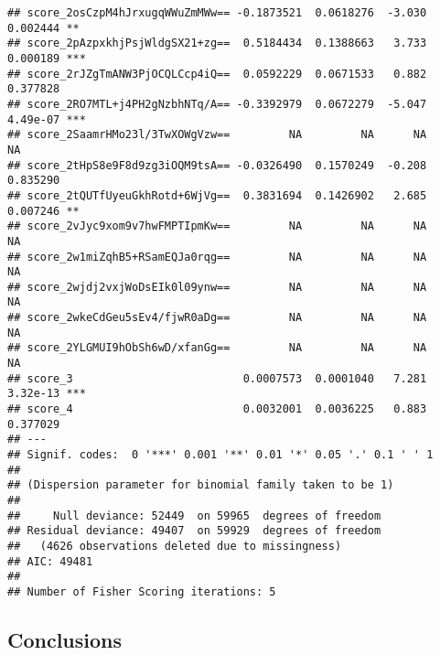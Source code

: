 \documentclass[]{article}
\begin{document}
\begin{verbatim}
## score_2osCzpM4hJrxugqWWuZmMWw== -0.1873521  0.0618276  -3.030 0.002444 ** 
## score_2pAzpxkhjPsjWldgSX21+zg==  0.5184434  0.1388663   3.733 0.000189 ***
## score_2rJZgTmANW3PjOCQLCcp4iQ==  0.0592229  0.0671533   0.882 0.377828    
## score_2RO7MTL+j4PH2gNzbhNTq/A== -0.3392979  0.0672279  -5.047 4.49e-07 ***
## score_2SaamrHMo23l/3TwXOWgVzw==         NA         NA      NA       NA    
## score_2tHpS8e9F8d9zg3iOQM9tsA== -0.0326490  0.1570249  -0.208 0.835290    
## score_2tQUTfUyeuGkhRotd+6WjVg==  0.3831694  0.1426902   2.685 0.007246 ** 
## score_2vJyc9xom9v7hwFMPTIpmKw==         NA         NA      NA       NA    
## score_2w1miZqhB5+RSamEQJa0rqg==         NA         NA      NA       NA    
## score_2wjdj2vxjWoDsEIk0l09ynw==         NA         NA      NA       NA    
## score_2wkeCdGeu5sEv4/fjwR0aDg==         NA         NA      NA       NA    
## score_2YLGMUI9hObSh6wD/xfanGg==         NA         NA      NA       NA    
## score_3                          0.0007573  0.0001040   7.281 3.32e-13 ***
## score_4                          0.0032001  0.0036225   0.883 0.377029    
## ---
## Signif. codes:  0 '***' 0.001 '**' 0.01 '*' 0.05 '.' 0.1 ' ' 1
## 
## (Dispersion parameter for binomial family taken to be 1)
## 
##     Null deviance: 52449  on 59965  degrees of freedom
## Residual deviance: 49407  on 59929  degrees of freedom
##   (4626 observations deleted due to missingness)
## AIC: 49481
## 
## Number of Fisher Scoring iterations: 5
\end{verbatim}

\subsection{Conclusions}\label{conclusions}
\end{document}

